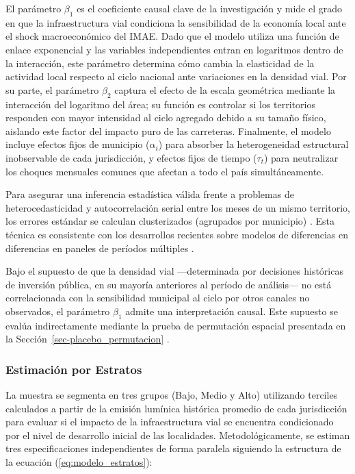 \documentclass[
  spanish,
  12pt,
  letterpaper]{article}
\begin{document}
El parámetro \(\beta_1\) es el coeficiente causal clave de la
investigación y mide el grado en que la infraestructura vial condiciona
la sensibilidad de la economía local ante el shock macroeconómico del
IMAE. Dado que el modelo utiliza una función de enlace exponencial y las
variables independientes entran en logaritmos dentro de la interacción,
este parámetro determina cómo cambia la elasticidad de la actividad
local respecto al ciclo nacional ante variaciones en la densidad vial.
Por su parte, el parámetro \(\beta_2\) captura el efecto de la escala
geométrica mediante la interacción del logaritmo del área; su función es
controlar si los territorios responden con mayor intensidad al ciclo
agregado debido a su tamaño físico, aislando este factor del impacto
puro de las carreteras. Finalmente, el modelo incluye efectos fijos de
municipio (\(\alpha_i\)) para absorber la heterogeneidad estructural
inobservable de cada jurisdicción, y efectos fijos de tiempo
(\(\tau_t\)) para neutralizar los choques mensuales comunes que afectan
a todo el país simultáneamente.

Para asegurar una inferencia estadística válida frente a problemas de
heterocedasticidad y autocorrelación serial entre los meses de un mismo
territorio, los errores estándar se calculan clusterizados (agrupados
por municipio)
\parencite{arellano1987computing, cameron2005microeconometrics}. Esta
técnica es consistente con los desarrollos recientes sobre modelos de
diferencias en diferencias en paneles de períodos múltiples
\parencite{callaway2021difference, wooldridge2021two}.

Bajo el supuesto de que la densidad vial ---determinada por decisiones
históricas de inversión pública, en su mayoría anteriores al período de
análisis--- no está correlacionada con la sensibilidad municipal al
ciclo por otros canales no observados, el parámetro \(\beta_1\) admite
una interpretación causal. Este supuesto se evalúa indirectamente
mediante la prueba de permutación espacial presentada en la
Sección~\ref{sec-placebo_permutacion}
\parencite{borusyak2022quasi, goldsmith2020bartik}.

\subsubsection{Estimación por
Estratos}\label{estimaciuxf3n-por-estratos}

La muestra se segmenta en tres grupos (Bajo, Medio y Alto) utilizando
terciles calculados a partir de la emisión lumínica histórica promedio
de cada jurisdicción para evaluar si el impacto de la infraestructura
vial se encuentra condicionado por el nivel de desarrollo inicial de las
localidades. Metodológicamente, se estiman tres especificaciones
independientes de forma paralela siguiendo la estructura de la ecuación
(\ref{eq:modelo_estratos}):
\end{document}
